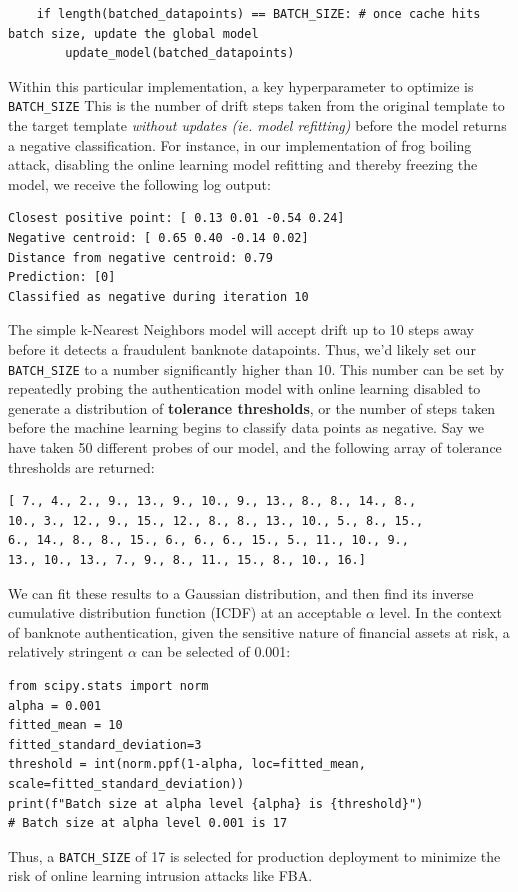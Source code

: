\documentclass{article}
\begin{document}
\begin{itemize}
\begin{lstlisting}
	if length(batched_datapoints) == BATCH_SIZE: # once cache hits batch size, update the global model
		update_model(batched_datapoints)
\end{lstlisting}
Within this particular implementation, a key hyperparameter to optimize is \lstinline!BATCH_SIZE! This is the number of drift steps taken from the original template to the target template \textit{without updates (ie. model refitting)} before the model returns a negative classification. For instance, in our implementation of frog boiling attack, disabling the online learning model refitting and thereby freezing the model, we receive the following log output:
\begin{verbatim}
Closest positive point: [ 0.13 0.01 -0.54 0.24]
Negative centroid: [ 0.65 0.40 -0.14 0.02]
Distance from negative centroid: 0.79
Prediction: [0]
Classified as negative during iteration 10
\end{verbatim}
The simple k-Nearest Neighbors model will accept drift up to 10 steps away before it detects a fraudulent banknote datapoints. Thus, we'd likely set our \lstinline!BATCH_SIZE! to a number significantly higher than 10. This number can be set by repeatedly probing the authentication model with online learning disabled to generate a distribution of \textbf{tolerance thresholds}, or the number of steps taken before the machine learning begins to classify data points as negative. Say we have taken 50 different probes of our model, and the following array of tolerance thresholds are returned:

\begin{verbatim}
[ 7., 4., 2., 9., 13., 9., 10., 9., 13., 8., 8., 14., 8.,
10., 3., 12., 9., 15., 12., 8., 8., 13., 10., 5., 8., 15.,
6., 14., 8., 8., 15., 6., 6., 6., 15., 5., 11., 10., 9.,
13., 10., 13., 7., 9., 8., 11., 15., 8., 10., 16.]
\end{verbatim}

We can fit these results to a Gaussian distribution, and then find its inverse cumulative distribution function (ICDF) at an acceptable $\alpha$ level. In the context of banknote authentication, given the sensitive nature of financial assets at risk, a relatively stringent $\alpha$ can be selected of 0.001:
\begin{lstlisting}
from scipy.stats import norm
alpha = 0.001
fitted_mean = 10
fitted_standard_deviation=3
threshold = int(norm.ppf(1-alpha, loc=fitted_mean, scale=fitted_standard_deviation))
print(f"Batch size at alpha level {alpha} is {threshold}")
# Batch size at alpha level 0.001 is 17
\end{lstlisting}

Thus, a \lstinline!BATCH_SIZE! of 17 is selected for production deployment to minimize the risk of online learning intrusion attacks like FBA.

 \end{itemize}
\end{document}
